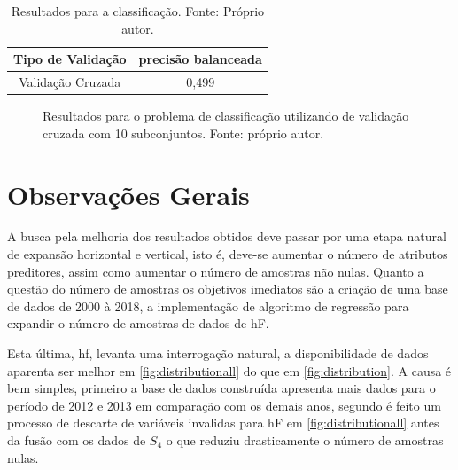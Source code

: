 \begin{table}[H]
\begin{center}
\begin{tabular}{|c|c|}
\hline
Tipo de Validação & precisão balanceada   \\ \hline
Validação Cruzada                   & 0,499   \\ \hline
\end{tabular}
\end{center}
\vspace{12pt}
\caption{Resultados para a classificação. Fonte: Próprio autor.}
\label{tab:results_all_class}
\end{table}

\begin{figure}[H]
\center
{}
\caption{Resultados para o problema de classificação utilizando de validação cruzada com 10 subconjuntos. Fonte: próprio autor.}
\label{fig:classallmik}
\end{figure}

\section{Observações Gerais}

A busca pela melhoria dos resultados obtidos deve passar por uma etapa natural de expansão horizontal e vertical, isto é, deve-se aumentar o número de atributos preditores, assim como aumentar o número de amostras não nulas. Quanto a questão do número de amostras os objetivos imediatos são a criação de uma base de dados de 2000 à 2018, a implementação de algoritmo de regressão para expandir o número de amostras de dados de hF. 

Esta última, hf, levanta uma interrogação natural, a disponibilidade de dados aparenta ser melhor em \ref{fig:distributionall} do que em \ref{fig:distribution}. A causa é bem simples, primeiro a base de dados construída apresenta mais dados para o período de 2012 e 2013 em comparação com os demais anos, segundo é feito um processo de descarte de variáveis invalidas para hF em \ref{fig:distributionall} antes da fusão com os dados de $S_4$ o que reduziu drasticamente o número de amostras nulas.
